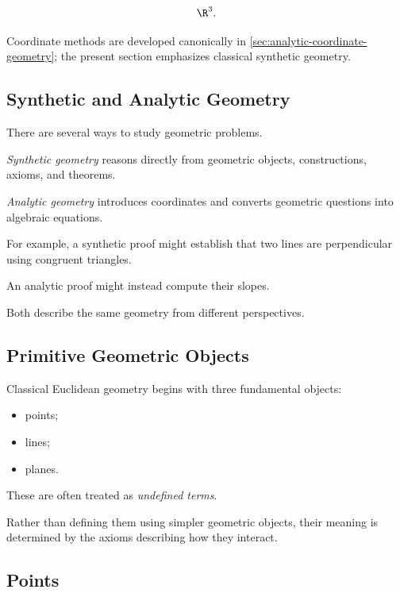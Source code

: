 \[ \R^3. \]

Coordinate methods are developed canonically in
\cref{sec:analytic-coordinate-geometry}; the present section emphasizes
classical synthetic geometry.

\subsection{Synthetic and Analytic Geometry}
\label{subsec:synthetic-analytic-geometry}

There are several ways to study geometric problems.

\emph{Synthetic geometry} reasons directly from geometric objects,
constructions, axioms, and theorems.

\emph{Analytic geometry} introduces coordinates and converts geometric
questions into algebraic equations.

For example, a synthetic proof might establish that two lines are
perpendicular using congruent triangles.

An analytic proof might instead compute their slopes.

Both describe the same geometry from different perspectives.

\subsection{Primitive Geometric Objects}
\label{subsec:primitive-geometric-objects}

Classical Euclidean geometry begins with three fundamental objects:

\begin{itemize}
    \item points;
    \item lines;
    \item planes.
\end{itemize}

These are often treated as \emph{undefined terms}.

Rather than defining them using simpler geometric objects, their meaning is
determined by the axioms describing how they interact.

\subsection{Points}
\label{subsec:euclidean-points}

